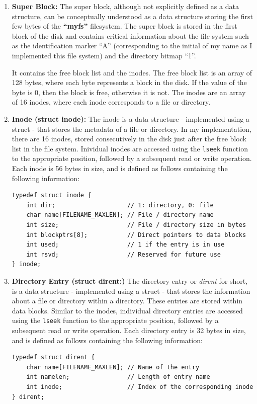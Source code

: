 \documentclass{article}
\theoremstyle{mytheoremstyle}
\theoremstyle{mytheoremstyle}
\theoremstyle{myproblemstyle}
\begin{document}
\begin{enumerate}
    \item \textbf{Super Block:} The super block, although not explicitly defined as a data structure, can be conceptually understood as a data structure storing the first few bytes of the \textbf{``myfs''} filesystem. The super block is stored in the first block of the disk and contains critical information about the file system such as the identification marker ``A'' (corresponding to the initial of my name as I implemented this file system) and the directory bitmap ``1''.
    
    It contains the free block list and the inodes. The free block list is an array of 128 bytes, where each byte represents a block in the disk. If the value of the byte is 0, then the block is free, otherwise it is not. The inodes are an array of 16 inodes, where each inode corresponds to a file or directory.

    \item \textbf{Inode (struct inode):} The inode is a data structure - implemented using a struct - that stores the metadata of a file or directory. In my implementation, there are 16 inodes, stored consecutively in the disk just after the free block list in the file system. Inividual inodes are accessed using the \texttt{lseek} function to the appropriate position, followed by a subsequent read or write operation. Each inode is 56 bytes in size, and is defined as follows containing the following information:
    \begin{lstlisting}[caption={Inode Structure}, label={lst:inode}]
typedef struct inode {
    int dir;                    // 1: directory, 0: file
    char name[FILENAME_MAXLEN]; // File / directory name
    int size;                   // File / directory size in bytes
    int blockptrs[8];           // Direct pointers to data blocks
    int used;                   // 1 if the entry is in use
    int rsvd;                   // Reserved for future use
} inode;
    \end{lstlisting}

    \item \textbf{Directory Entry (struct dirent:)} The directory entry or \textit{dirent} for short, is a data structure - implemented using a struct - that stores the information about a file or directory within a directory. These entries are stored within data blocks. Similar to the inodes, individual directory entries are accessed using the \texttt{lseek} function to the appropriate position, followed by a subsequent read or write operation. Each directory entry is 32 bytes in size, and is defined as follows containing the following information:
    \begin{lstlisting}[caption={Dirent Structure}, label={lst:directory_entry}]
typedef struct dirent {
    char name[FILENAME_MAXLEN]; // Name of the entry
    int namelen;                // Length of entry name
    int inode;                  // Index of the corresponding inode
} dirent;   
    \end{lstlisting}


\end{enumerate}
\end{document}
